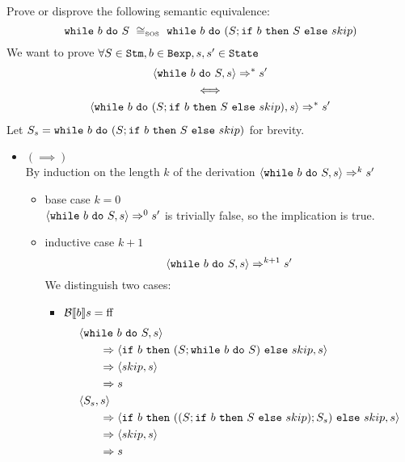 \begin{exercise}{
    Prove or disprove the following semantic equivalence:
    \[ \wwhile{b}{S}\ \SOScong\ \wwhile{b}{(S;\wif{b}{S}{skip})} \]
}
    We want to prove $\forall S \in \texttt{Stm}, b \in \texttt{Bexp}, s, s' \in \texttt{State}$
    \begin{gather*}
        \left<\texttt{while}\ b\ \texttt{do}\ S, s\right> \Rightarrow^* s' \\
        \iff \\
        \left<\texttt{while}\ b\ \texttt{do}\ (S;\texttt{if}\ b\ \texttt{then}\ S\ \texttt{else}\ skip), s\right> \Rightarrow^* s'
    \end{gather*}
    Let $S_s = \texttt{while}\ b\ \texttt{do}\ (S;\texttt{if}\ b\ \texttt{then}\ S\ \texttt{else}\ skip)$ for brevity.
    \begin{itemize}
        \item $(\implies)$ \\
            By induction on the length $k$ of the derivation $\left<\texttt{while}\ b\ \texttt{do}\ S, s\right> \Rightarrow^k s'$
            \begin{itemize}
                \item base case $k=0$ \\
                    $\left<\texttt{while}\ b\ \texttt{do}\ S, s\right> \Rightarrow^0 s'$ is trivially false, so the implication is true.
                \item inductive case $k+1$
                    \[ \left<\texttt{while}\ b\ \texttt{do}\ S, s\right> \Rightarrow^{k+1} s' \]
                    We distinguish two cases:
                    \begin{itemize}
                        \item $\mathcal{B} \llbracket b \rrbracket s = \text{ff}$
                            \begin{align*}
                                &\left<\texttt{while}\ b\ \texttt{do}\ S, s\right>
                                \\&\qquad\Rightarrow \left<\texttt{if}\ b\ \texttt{then}\ (S; \texttt{while}\ b\ \texttt{do}\ S)\ \texttt{else}\ skip, s\right>
                                \\&\qquad\Rightarrow \left<skip, s\right>
                                \\&\qquad\Rightarrow s
                                \\
                                &\left<S_s, s\right>
                                \\&\qquad\Rightarrow \left<\texttt{if}\ b\ \texttt{then}\ ((S;\texttt{if}\ b\ \texttt{then}\ S\ \texttt{else}\ skip);S_s)\ \texttt{else}\ skip, s\right>
                                \\&\qquad\Rightarrow \left<skip, s\right>
                                \\&\qquad\Rightarrow s
                            \end{align*}

\end{itemize}
\end{itemize}
\end{itemize}
\end{exercise}
